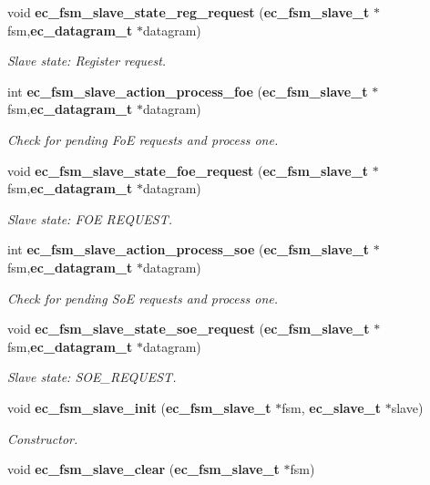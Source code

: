 \begin{DoxyCompactItemize}
void {\bf ec\-\_\-fsm\-\_\-slave\-\_\-state\-\_\-reg\-\_\-request} ({\bf ec\-\_\-fsm\-\_\-slave\-\_\-t} $\ast$fsm,{\bf ec\-\_\-datagram\-\_\-t} $\ast$datagram)
\begin{DoxyCompactList}\small\item\em Slave state\-: Register request. \end{DoxyCompactList}\item 
int {\bf ec\-\_\-fsm\-\_\-slave\-\_\-action\-\_\-process\-\_\-foe} ({\bf ec\-\_\-fsm\-\_\-slave\-\_\-t} $\ast$fsm,{\bf ec\-\_\-datagram\-\_\-t} $\ast$datagram)
\begin{DoxyCompactList}\small\item\em Check for pending Fo\-E requests and process one. \end{DoxyCompactList}\item 
void {\bf ec\-\_\-fsm\-\_\-slave\-\_\-state\-\_\-foe\-\_\-request} ({\bf ec\-\_\-fsm\-\_\-slave\-\_\-t} $\ast$fsm,{\bf ec\-\_\-datagram\-\_\-t} $\ast$datagram)
\begin{DoxyCompactList}\small\item\em Slave state\-: F\-O\-E R\-E\-Q\-U\-E\-S\-T. \end{DoxyCompactList}\item 
int {\bf ec\-\_\-fsm\-\_\-slave\-\_\-action\-\_\-process\-\_\-soe} ({\bf ec\-\_\-fsm\-\_\-slave\-\_\-t} $\ast$fsm,{\bf ec\-\_\-datagram\-\_\-t} $\ast$datagram)
\begin{DoxyCompactList}\small\item\em Check for pending So\-E requests and process one. \end{DoxyCompactList}\item 
void {\bf ec\-\_\-fsm\-\_\-slave\-\_\-state\-\_\-soe\-\_\-request} ({\bf ec\-\_\-fsm\-\_\-slave\-\_\-t} $\ast$fsm,{\bf ec\-\_\-datagram\-\_\-t} $\ast$datagram)
\begin{DoxyCompactList}\small\item\em Slave state\-: S\-O\-E\-\_\-\-R\-E\-Q\-U\-E\-S\-T. \end{DoxyCompactList}\item 
void {\bf ec\-\_\-fsm\-\_\-slave\-\_\-init} ({\bf ec\-\_\-fsm\-\_\-slave\-\_\-t} $\ast$fsm, {\bf ec\-\_\-slave\-\_\-t} $\ast$slave)
\begin{DoxyCompactList}\small\item\em Constructor. \end{DoxyCompactList}\item 
void {\bf ec\-\_\-fsm\-\_\-slave\-\_\-clear} ({\bf ec\-\_\-fsm\-\_\-slave\-\_\-t} $\ast$fsm)

\end{DoxyCompactItemize}
